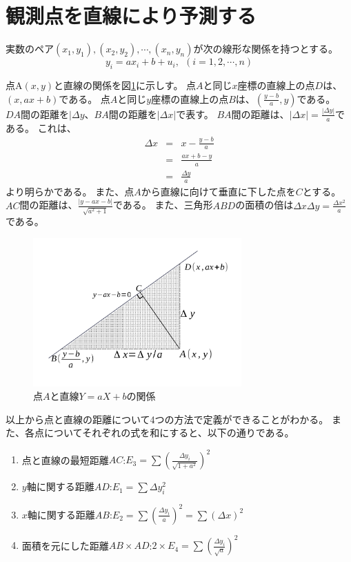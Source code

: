 \section{観測点を直線により予測する}
実数のペア$(x_1,y_1),(x_2,y_2),\cdots,(x_n,y_n)$が次の線形な関係を持つとする。
\begin{equation*}
 y_i = ax_i+b+u_i, \ \ (i=1,2,\cdots,n)
\end{equation*}

点A$(x,y)$と直線の関係を図\ref{fig:RegressionModel}に示しす。
点$A$と同じ$x$座標の直線上の点$D$は、$(x,ax+b)$である。
点$A$と同じ$y$座標の直線上の点$B$は、$(\frac{y-b}{a},y)$である。
$DA$間の距離を$|\Delta y$、$BA$間の距離を$|\Delta x|$で表す。
$BA$間の距離は、$|\Delta x| = \frac{|\Delta y|}{a}$である。
これは、
\begin{eqnarray*}
 \Delta x &=& x-\frac{y-b}{a} \\
 &=& \frac{ax+b-y}{a} \\
 &=& \frac{\Delta y}{a}
\end{eqnarray*}
より明らかである。
また、点$A$から直線に向けて垂直に下した点を$C$とする。
$AC$間の距離は、$\frac{|y-ax-b|}{\sqrt{a^2+1}}$である。
また、三角形$ABD$の面積の倍は$\Delta x\Delta y =\frac{\Delta x^2}{a}$である。


\begin{figure}
 \begin{center}
  \includegraphics[width=8cm]{./image/16_/RegressionModel.pdf}
  \caption{点$A$と直線$Y=aX+b$の関係}
  \label{fig:RegressionModel}
 \end{center}
\end{figure}

以上から点と直線の距離について4つの方法で定義ができることがわかる。
また、各点についてそれぞれの式を和にすると、以下の通りである。
\begin{enumerate}
 \item 点と直線の最短距離$AC$:$E_3 = \sum (\frac{\Delta y_i}{\sqrt{1+a^2}})^2$
 \item $y$軸に関する距離$AD$:$E_1=\sum \Delta y_i^2$
 \item $x$軸に関する距離$AB$:$E_2=\sum  (\frac{\Delta y_i}{a})^2=\sum (\Delta x)^2$
 \item 面積を元にした距離$AB\times AD$:$2\times E_4 = \sum (\frac{\Delta y_i}{\sqrt{a}})^2$
\end{enumerate}

